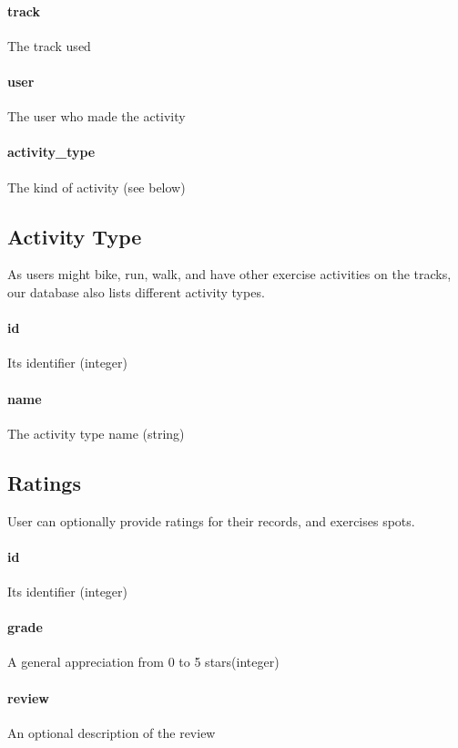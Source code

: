 \documentclass[a4paper]{article}
\begin{document}
\paragraph{track} The track used
\paragraph{user} The user who made the activity
\paragraph{activity\_type} The kind of activity (see below)


\subsection{Activity Type}
As users might bike, run, walk, and have other exercise activities on the tracks,
our database also lists different activity types.

\paragraph{id} Its identifier (integer)
\paragraph{name} The activity type name (string)


\subsection{Ratings}
User can optionally provide ratings for their records, and exercises spots.

\paragraph{id} Its identifier (integer)
\paragraph{grade} A general appreciation from 0 to 5 stars(integer)
\paragraph{review} An optional description of the review
\end{document}
